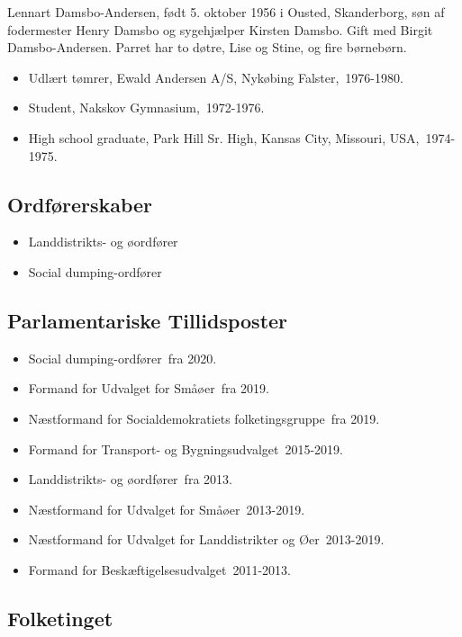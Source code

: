 \documentclass[11pt, a4paper]{awesome-cv}
\begin{document}
\makecvheader[R]
\makelettertitle
\begin{cvletter}
Lennart Damsbo-Andersen, født 5. oktober 1956 i Ousted, Skanderborg, søn af fodermester Henry Damsbo og sygehjælper Kirsten Damsbo. Gift med Birgit Damsbo-Andersen. Parret har to døtre, Lise og Stine, og fire børnebørn.

\begin{itemize}
\item Udlært tømrer, Ewald Andersen A/S, Nykøbing Falster, 1976-1980.
\item Student, Nakskov Gymnasium, 1972-1976.
\item High school graduate, Park Hill Sr. High, Kansas City, Missouri, USA, 1974-1975.
\end{itemize}
\subsection*{Ordførerskaber}
\begin{itemize}
\item Landdistrikts- og øordfører
\item Social dumping-ordfører
\end{itemize}
\subsection*{Parlamentariske Tillidsposter}
\begin{itemize}
\item Social dumping-ordfører fra 2020.
\item Formand for Udvalget for Småøer fra 2019.
\item Næstformand for Socialdemokratiets folketingsgruppe fra 2019.
\item Formand for Transport- og Bygningsudvalget 2015-2019.
\item Landdistrikts- og øordfører fra 2013.
\item Næstformand for Udvalget for Småøer 2013-2019.
\item Næstformand for Udvalget for Landdistrikter og Øer 2013-2019.
\item Formand for Beskæftigelsesudvalget 2011-2013.
\end{itemize}
\subsection*{Folketinget}

\end{cvletter}
\end{document}
